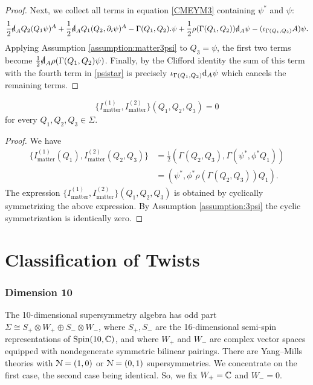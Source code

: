 \documentclass[10pt, oneside]{article}
\newcommand{\matter}{\mathrm{matter}}
\begin{document}
\begin{proof}
Next, we collect all terms in equation \eqref{CMEYM3} containing $\psi^*$ and $\psi$:
\begin{equation}\label{psistar}
\frac{1}{2} \sd \d_A Q_2(Q_1 \psi)^A + \frac{1}{2} \sd \d_A Q_1(Q_2, \partial_i\psi)^A - \Gamma(Q_1,Q_2) . \psi + \frac{1}{2} \rho(\Gamma(Q_1,Q_2)) \sd \d_A \psi - (\iota_{\Gamma(Q_1, Q_2)} A)\psi.
\end{equation}
Applying Assumption \ref{assumption:matter3psi} to $Q_3 = \psi$, the first two terms become $\frac{1}{2} \sd \d_A \rho(\Gamma(Q_1,Q_2) \psi)$. 
Finally, by the Clifford identity the sum of this term with the fourth term in \eqref{psistar} is precisely $\iota_{\Gamma(Q_1,Q_2)}{\rm d}_A \psi$ which cancels the remaining terms.
\end{proof}

\begin{lemma}
\[\{I_{\matter}^{(1)}, I_{\matter}^{(2)}\}(Q_1, Q_2, Q_3) = 0\]
for every $Q_1, Q_2, Q_3\in \Sigma$.
\end{lemma}
\begin{proof}
We have
\begin{align*}
\{I_{\matter}^{(1)}(Q_1), I_{\matter}^{(2)}(Q_2, Q_3)\} & = \frac{1}{2} (\Gamma(Q_2, Q_3), \Gamma(\psi^*, \phi^* Q_1)) \\ & = (\psi^*, \phi^* \rho(\Gamma(Q_2,Q_3)) Q_1)  .
\end{align*}
The expression
$\{I_{\matter}^{(1)}, I_{\matter}^{(2)}\}(Q_1,Q_2,Q_3)$ is obtained by cyclically symmetrizing the above expression. By Assumption \ref{assumption:3psi} the cyclic symmetrization is identically zero.
\end{proof}

\part{Classification of Twists}

\section{Dimension 10}

The 10-dimensional supersymmetry algebra has odd part $\Sigma\cong S_+\otimes W_+\oplus S_-\otimes W_-$, where $S_+, S_-$ are the 16-dimensional semi-spin representations of $\mathrm{Spin}(10, \mathbb C)$, and where $W_+$ and $W_-$ are complex vector spaces equipped with nondegenerate symmetric bilinear pairings. There are Yang--Mills theories with $\mathcal N=(1, 0)$ or $\mathcal N=(0, 1)$ supersymmetries. We concentrate on the first case, the second case being identical. So, we fix $W_+=\mathbb C$ and $W_- = 0$.
\end{document}
